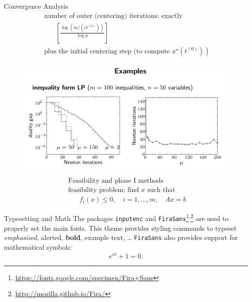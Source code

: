 \documentclass{beamer}
\begin{document}
\begin{frame}[noframenumbering]{Convergence Analysis}
\begin{equation*}
\begin{array}{l}{\text { number of outer (centering) iterations: exactly }} \\ {\qquad\left[\frac{\log \left(m /\left(\epsilon t^{(0)}\right)\right)}{\log \mu}\right]} \\ { \text { plus the initial centering step (to compute }\left.x^{\star}\left(t^{(0)}\right)\right)}\end{array}
\end{equation*}
\begin{figure}
	\centering
	\includegraphics[width=0.7\linewidth]{Images/example}
	\label{fig:example}
\end{figure}
\end{frame}
\begin{equation}
\begin{array}{l}{\text { Feasibility and phase I methods }} \\ {\text { feasibility problem: find } x \text { such that }} \\ {\qquad f_{i}(x) \leq 0, \quad i=1, \ldots, m, \quad A x=b}\end{array}
\end{equation}
\begin{frame}

\end{frame}

\begin{frame}{Typesetting and Math}
	The packages \texttt{inputenc} and \texttt{FiraSans}\footnote{\url{https://fonts.google.com/specimen/Fira+Sans}}\textsuperscript{,}\footnote{\url{http://mozilla.github.io/Fira/}} are used to properly set the main fonts.
	\vfill
	This theme provides styling commands to typeset \emph{emphasized}, \alert{alerted}, \textbf{bold}, \textcolor{example}{example text}, \dots
	\vfill
	\texttt{FiraSans} also provides support for mathematical symbols:
	\begin{equation*}
		e^{i\pi} + 1 = 0.
	\end{equation*}
\end{frame}
\end{document}
